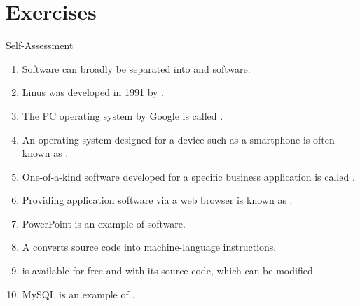 \documentclass[\main/notes.tex]{subfiles}
\begin{document}
		\section{Exercises}	
			\begin{exercise}{Self-Assessment}
				\begin{enumerate}
					\item Software can broadly be separated into  and  software.
					\item Linus was developed in 1991 by .
					\item The PC operating system by Google is called .
					\item An operating system designed for a device such as a smartphone is often known as .
					\item One-of-a-kind software developed for a specific business application is called .
					\item Providing application software via a web browser is known as .
					\item PowerPoint is an example of  software.
					\item A  converts source code into machine-language instructions.
					\item {} is available for free and with its source code, which can be modified.
					\item MySQL is an example of .
				\end{enumerate}
			\end{exercise}
	\vbox{}
\end{document}
